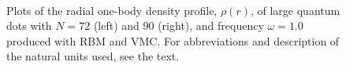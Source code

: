 \begin{figure}
	\centering
	\captionsetup[subfigure]{labelformat=empty}
	\hspace{-0.5cm}
	\\
	\caption{Plots of the radial one-body density profile, $\rho(r)$, of large quantum dots with $N=72$ (left) and 90 (right), and frequency $\omega=1.0$ produced with RBM and VMC. For abbreviations and description of the natural units used, see the text.}
	\label{fig:largedotsOB}
\end{figure}


